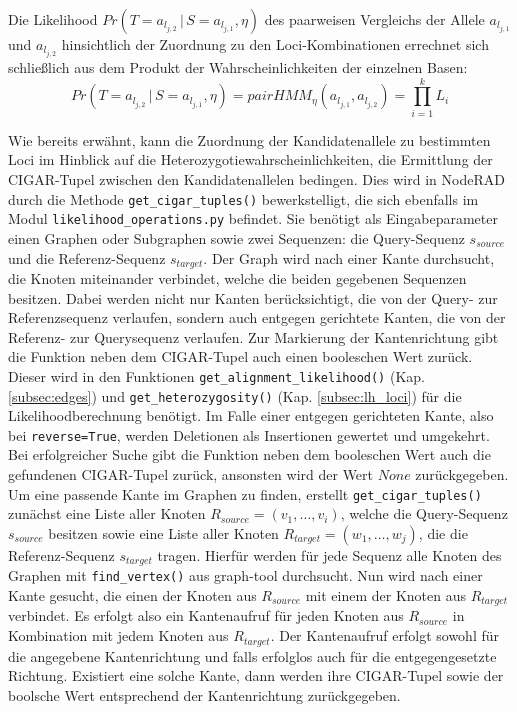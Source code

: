 Die Likelihood $ Pr(T=a_{l_{j,2}} \, | \, S=a_{l_{j,1}}, \eta) $ des paarweisen Vergleichs der Allele $a_{l_{j,1}}$ und $a_{l_{j,2}}$ hinsichtlich der Zuordnung zu den Loci-Kombinationen errechnet sich schließlich aus dem Produkt der Wahrscheinlichkeiten der einzelnen Basen:
\begin{equation} \label{eqn:3-32}
\tag{3-32}
Pr(T=a_{l_{j,2}} \, | \, S=a_{l_{j,1}}, \eta) = pairHMM_{\eta}(a_{l_{j,1}}, a_{l_{j,2}}) = \prod_{i=1}^{k}L_{i}
\end{equation}


Wie bereits erwähnt, kann die Zuordnung der Kandidatenallele zu bestimmten Loci im Hinblick auf die Heterozygotiewahrscheinlichkeiten, die Ermittlung der CIGAR-Tupel zwischen den Kandidatenallelen bedingen. Dies wird in NodeRAD durch die Methode \lstinline|get_cigar_tuples()| bewerkstelligt, die sich ebenfalls im Modul \lstinline|likelihood_operations.py| befindet. Sie benötigt als Eingabeparameter einen Graphen oder Subgraphen sowie zwei Sequenzen: die Query-Sequenz $ s_{source} $ und die Referenz-Sequenz $ s_{target} $. Der Graph wird nach einer Kante durchsucht, die Knoten miteinander verbindet, welche die beiden gegebenen Sequenzen besitzen. Dabei werden nicht nur Kanten berücksichtigt, die von der Query- zur Referenzsequenz verlaufen, sondern auch entgegen gerichtete Kanten, die von der Referenz- zur Querysequenz verlaufen. Zur Markierung der Kantenrichtung gibt die Funktion neben dem CIGAR-Tupel auch einen booleschen Wert zurück. Dieser wird in den Funktionen \lstinline|get_alignment_likelihood()| (Kap. \ref{subsec:edges}) und \lstinline|get_heterozygosity()| (Kap. \ref{subsec:lh_loci}) für die Likelihoodberechnung benötigt. Im Falle einer entgegen gerichteten Kante, also bei \lstinline|reverse=True|, werden Deletionen als Insertionen gewertet und umgekehrt. Bei erfolgreicher Suche gibt die Funktion neben dem booleschen Wert auch die gefundenen CIGAR-Tupel zurück, ansonsten wird der Wert $ None $ zurückgegeben.\\

Um eine passende Kante im Graphen zu finden, erstellt \lstinline|get_cigar_tuples()| zunächst eine Liste aller Knoten $ R_{source} = (v_{1}, \dots, v_{i})$, welche die Query-Sequenz $ s_{source} $ besitzen sowie eine Liste aller Knoten $ R_{target} = (w_{1}, \dots, w_{j}) $, die die Referenz-Sequenz $ s_{target} $ tragen. Hierfür werden für jede Sequenz alle Knoten des Graphen mit \lstinline|find_vertex()| aus graph-tool durchsucht. Nun wird nach einer Kante gesucht, die einen der Knoten aus $ R_{source} $ mit einem der Knoten aus $ R_{target} $ verbindet. Es erfolgt also ein Kantenaufruf für jeden Knoten aus $ R_{source} $ in Kombination mit jedem  Knoten aus $ R_{target} $. Der Kantenaufruf erfolgt sowohl für die angegebene Kantenrichtung und falls erfolglos auch für die entgegengesetzte Richtung. Existiert eine solche Kante, dann werden ihre CIGAR-Tupel sowie der boolsche Wert entsprechend der Kantenrichtung zurückgegeben. \\

